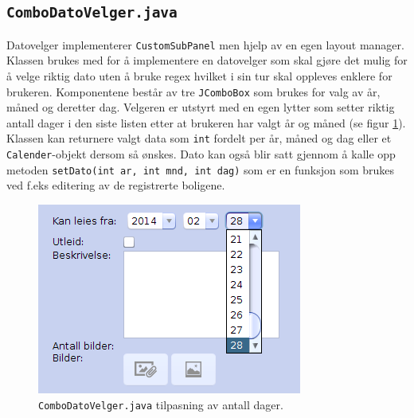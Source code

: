 \subsection{\texttt{ComboDatoVelger.java}}
Datovelger implementerer \texttt{CustomSubPanel} men hjelp av en egen layout manager. Klassen brukes med for å implementere en datovelger som skal gjøre det mulig for å velge riktig dato uten å bruke regex hvilket i sin tur skal oppleves enklere for brukeren. Komponentene består av tre \texttt{JComboBox} som brukes for valg av år, måned og deretter dag. Velgeren er utstyrt med en egen lytter som setter riktig antall dager i den siste listen etter at brukeren har valgt år og måned (se figur \ref{fig:combo_datovelger}).
Klassen kan returnere valgt data som \texttt{int} fordelt per år, måned og dag eller et \texttt{Calender}-objekt dersom så ønskes. Dato kan også blir satt gjennom å kalle opp metoden \texttt{setDato(int ar, int mnd, int dag)} som  er en funksjon som brukes ved f.eks editering av de registrerte boligene. 


\begin{figure}[ht]
\center
 \includegraphics[scale=0.5]{./img/produktdokumentasjon/swing_componenter/combo_datovelger.png}
 \caption{\texttt{ComboDatoVelger.java} tilpasning av antall dager.}
 \label{fig:combo_datovelger}
\end{figure}

